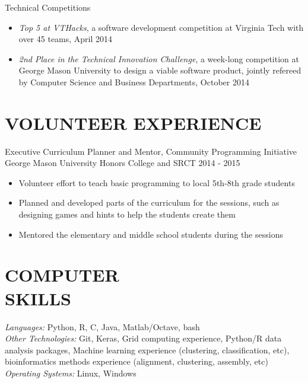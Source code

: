 \documentclass[margin, 10pt]{res} %
\begin{document}
\begin{resume}
Technical Competitions
\begin{itemize} \itemsep -2pt %
\item {\sl Top 5 at VTHacks}, a software development competition at Virginia Tech with over 45 teams, April 2014
\item {\sl 2nd Place in the Technical Innovation Challenge}, a week-long competition at George Mason University to design a viable software product, jointly refereed by Computer Science and Business Departments, October 2014
\end{itemize}


\section{VOLUNTEER EXPERIENCE}

Executive Curriculum Planner and Mentor, Community Programming Initiative \\ George Mason University Honors College and SRCT
 \hfill 2014 - 2015
\begin{itemize} \itemsep -2pt %
\item Volunteer effort to teach basic programming to local 5th-8th grade students
\item Planned and developed parts of the curriculum for the sessions, such as designing games and hints to help the students create them
\item Mentored the elementary and middle school students during the sessions
\end{itemize} 


\section{COMPUTER \\ SKILLS} 

{\sl Languages:} 
Python, R, C, Java, Matlab/Octave, bash\\
{\sl Other Technologies:} Git, Keras, Grid computing experience, Python/R data analysis packages, Machine learning experience (clustering, classification, etc), bioinformatics methods experience (alignment, clustering, assembly, etc)\\
{\sl Operating Systems:} Linux, Windows 


\end{resume}
\end{document}
